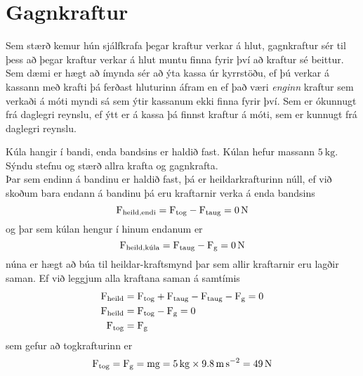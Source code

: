 \section{Gagnkraftur}
Sem stærð kemur hún sjálfkrafa þegar kraftur verkar á hlut, gagnkraftur sér til þess
að þegar kraftur verkar á hlut muntu finna fyrir því að kraftur sé beittur. Sem dæmi
er hægt að ímynda sér að ýta kassa úr kyrrstöðu, ef þú verkar á kassann með krafti þá ferðast
hluturinn áfram en ef það væri \emph{enginn} kraftur sem verkaði á móti myndi sá sem
ýtir kassanum ekki finna fyrir því. Sem er ókunnugt frá daglegri reynslu, ef ýtt er á
kassa þá finnst kraftur á móti, sem er kunnugt frá daglegri reynslu.

\begin{formalexample}
\begin{wrapfigure}{r}{0.25\textwidth}
	\vspace{-20pt}
	\begin{center}
	\end{center}
	\vspace{-10pt}
\end{wrapfigure}
Kúla hangir í bandi, enda bandsins er haldið fast. Kúlan hefur massann 
$\SI{5}{\kg}$.
Sýndu stefnu og stærð allra krafta og gagnkrafta.
\\[4 ex]
Þar sem endinn á bandinu er haldið fast, þá er heildarkrafturinn núll, ef við skoðum
bara endann á bandinu þá eru kraftarnir verka á enda bandsins
\[
	\textrm{F}_\text{heild,endi} = \textrm{F}_\text{tog} - \textrm{F}_\text{taug} 
	= \SI{0}{\newton} 
\]
og þar sem kúlan hengur í hinum endanum er
\[
	\textrm{F}_\text{heild,kúla} = \textrm{F}_\text{taug} - \textrm{F}_\text{g} 
	= \SI{0}{\newton}
\]
núna er hægt að búa til heildar-kraftsmynd þar sem allir kraftarnir eru lagðir saman.
Ef við leggjum alla kraftana saman á samtímis
\begin{align*}
	\textrm{F}_\text{heild} &= \textrm{F}_\text{tog} 
		+ \textrm{F}_\text{taug} 
		- \textrm{F}_\text{taug} - \textrm{F}_\text{g}
	= 0 \\
	\textrm{F}_\text{heild} &= \textrm{F}_\text{tog} 
		- \textrm{F}_\text{g}
	= 0 \\
	\textrm{F}_\text{tog} &= \textrm{F}_\text{g}
\end{align*}
sem gefur að togkrafturinn er
\[
	\uforce_\text{tog} = \uforce_\text{g} = \umass \uacceleg 
		= \SI{5}{\kg} \times \SI{9.8}{\meter\per\second\squared}
		= \SI{49}{\newton}
\]
\end{formalexample}

